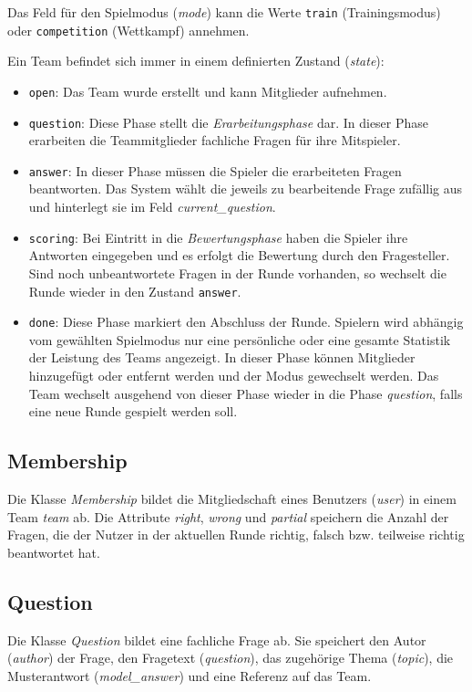 \documentclass[a4paper,11pt,listof=numbered,glossary=totoc,parskip=half,toc=bib]{scrreprt}
\begin{document}
	Das Feld für den Spielmodus (\textit{mode}) kann die Werte \texttt{train} (Trainingsmodus) oder \texttt{competition} (Wettkampf) annehmen.
	
	Ein Team befindet sich immer in einem definierten Zustand (\textit{state}):
	
	\begin{itemize}
		\item \texttt{open}: Das Team wurde erstellt und kann Mitglieder aufnehmen.
		\item \texttt{question}: Diese Phase stellt die \textit{Erarbeitungsphase} dar. In dieser Phase erarbeiten die Teammitglieder fachliche Fragen für ihre Mitspieler. 
		\item \texttt{answer}: In dieser Phase müssen die Spieler die erarbeiteten Fragen beantworten. Das System wählt die jeweils zu bearbeitende Frage zufällig aus und hinterlegt sie im Feld \textit{current\_{}question}.
		\item \texttt{scoring}: Bei Eintritt in die \textit{Bewertungsphase} haben die Spieler ihre Antworten eingegeben und es erfolgt die Bewertung durch den Fragesteller. Sind noch unbeantwortete Fragen in der Runde vorhanden, so wechselt die Runde wieder in den Zustand \texttt{answer}.
		
		\item \texttt{done}: Diese Phase markiert den Abschluss der Runde. Spielern wird abhängig vom gewählten Spielmodus nur eine persönliche oder eine gesamte Statistik der Leistung des Teams angezeigt. In dieser Phase können Mitglieder hinzugefügt oder entfernt werden und der Modus gewechselt werden. Das Team wechselt ausgehend von dieser Phase wieder in die Phase \textit{question}, falls eine neue Runde gespielt werden soll.
		
	\end{itemize}
	
	\subsection{Membership}
	Die Klasse \textit{Membership} bildet die Mitgliedschaft eines Benutzers (\textit{user}) in einem Team \textit{team} ab.
	Die Attribute \textit{right}, \textit{wrong} und \textit{partial} speichern die Anzahl der Fragen, die der Nutzer in der aktuellen Runde richtig, falsch bzw. teilweise richtig beantwortet hat. 
	
	\subsection{Question}
	Die Klasse \textit{Question} bildet eine fachliche Frage ab. Sie speichert den Autor (\textit{author}) der Frage, den Fragetext (\textit{question}), das zugehörige Thema (\textit{topic}), die Musterantwort (\textit{model\_{}answer}) und eine Referenz auf das Team.
	
\end{document}
